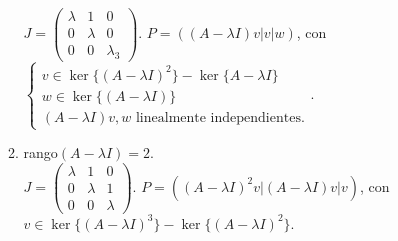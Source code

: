 \documentclass[11pt, a4paper,twoside]{article}
\theoremstyle{theorem-style}  %
\theoremstyle{definition-style}
\theoremstyle{example-style}
\begin{document}
\begin{enumerate}
\begin{enumerate}
		$ J=\begin{pmatrix}
		\lambda &1 &0\\
		0 &\lambda &0\\
		0 &0 &\lambda_3
		\end{pmatrix} $. $ P=((A-\lambda I)v|v|w) $, con $ \begin{cases}
		v \in \ker\{(A-\lambda I)^2\}-\ker\{A-\lambda I\} \\
		w \in \ker\{(A-\lambda I)\}\\
		(A-\lambda I)v,w\text{ linealmente independientes.}
		\end{cases}$.	
		\item rango$ (A-\lambda I )= 2 $. \\
		$ J=\begin{pmatrix}
		\lambda &1 &0\\
		0 &\lambda &1\\
		0 &0 &\lambda
		\end{pmatrix} $. $ P=((A-\lambda I)^2v|(A-\lambda I)v|v) $, con $ v \in \ker\{(A-\lambda I)^3\}-\ker\{(A-\lambda I)^2\} $.
	\end{enumerate}
\end{enumerate}
\printindex
\end{document}
